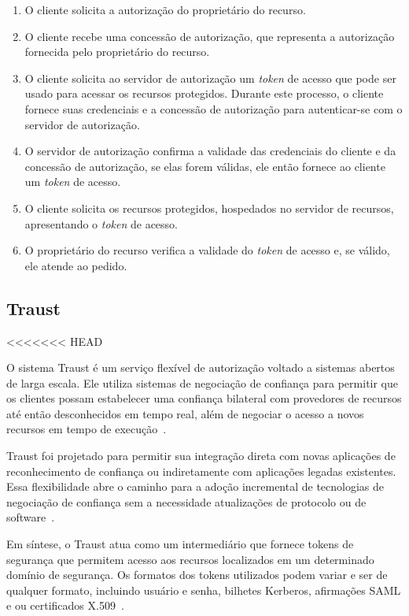 \begin{enumerate}[a )]
        \item O cliente solicita a autorização do proprietário do recurso.
        \item O cliente recebe uma concessão de autorização, que representa a autorização fornecida pelo proprietário do recurso.
        \item O cliente solicita ao servidor de autorização um \emph{token} de acesso que pode ser usado para acessar os recursos protegidos. Durante este processo, o cliente fornece suas credenciais e a concessão de autorização para autenticar-se com o servidor de autorização.
        \item O servidor de autorização confirma a validade das credenciais do cliente e da concessão de autorização, se elas forem válidas, ele então fornece ao cliente um \emph{token} de acesso.
        \item O cliente solicita os recursos protegidos, hospedados no servidor de recursos, apresentando o \emph{token} de acesso.
        \item  O proprietário do recurso verifica a validade do \emph{token} de acesso e, se válido, ele atende ao pedido.

\end{enumerate}

\subsection{Traust}
<<<<<<< HEAD

O sistema Traust é um serviço flexível de autorização voltado a sistemas abertos de larga escala. Ele utiliza sistemas de negociação de confiança para permitir que os clientes possam estabelecer uma confiança bilateral com provedores de recursos até então desconhecidos em tempo real, além de negociar o acesso a novos recursos em tempo de execução~\cite{traust08}.

Traust foi projetado para permitir sua integração direta com novas aplicações de reconhecimento de confiança ou indiretamente com aplicações legadas existentes. Essa flexibilidade abre o caminho para a adoção incremental de tecnologias de negociação de confiança sem a necessidade atualizações de protocolo ou de software~\cite{traust08}.

Em síntese, o Traust atua como um intermediário que fornece tokens de segurança que permitem acesso aos recursos localizados em um determinado domínio de segurança. Os formatos dos tokens utilizados podem variar e ser de qualquer formato, incluindo usuário e senha, bilhetes Kerberos, afirmações SAML e ou certificados X.509~\cite{traust08}.

